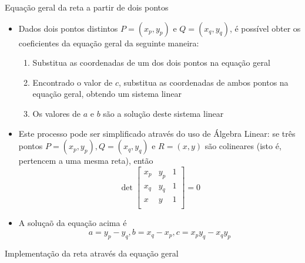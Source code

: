 \begin{frame}[fragile]{Equação geral da reta a partir de dois pontos}

    \begin{itemize}
        \item Dados dois pontos distintos $P = (x_p, y_p)$ e $Q = (x_q, y_q)$, é possível obter os 
        coeficientes da equação geral da seguinte maneira:

        \begin{enumerate}
            \item Substitua as coordenadas de um dos dois pontos na equação geral
            \item Encontrado o valor de $c$, substitua as coordenadas de ambos pontos na equação
            geral, obtendo um sistema linear
            \item Os valores de $a$ e $b$ são a solução deste sistema linear
        \end{enumerate}

        \item Este processo pode ser simplificado através do uso de Álgebra Linear: se três pontos 
        $P = (x_p, y_p), Q = (x_q, y_q)$ e $R = (x, y)$ são colineares 
        (isto é, pertencem a uma mesma reta), então
        \[
            \det \begin{bmatrix}
                x_p & y_p  & 1 \\
                x_q & y_q  & 1 \\
                x & y  & 1 \\
            \end{bmatrix} = 0
        \]

        \item A soluçaõ da equação acima é
        \[
            a = y_p - y_q, b = x_q - x_p, c = x_py_q - x_qy_p
        \]
    \end{itemize}
\end{frame}

\begin{frame}[fragile]{Implementação da reta através da equação geral}
\end{frame}

